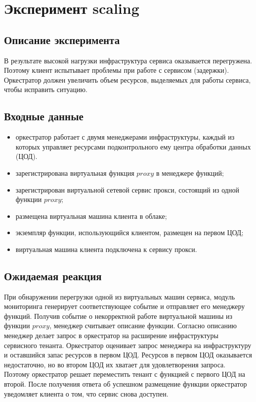 \documentclass[oneside,final,14pt,a4paper]{extreport}
\begin{document}
\section{Эксперимент scaling}
\subsection{Описание эксперимента}
В результате высокой нагрузки инфраструктура сервиса оказывается перегружена. Поэтому клиент испытывает проблемы при работе с сервисом (задержки). Оркестратор должен увеличить объем ресурсов, выделяемых для работы сервиса, чтобы исправить ситуацию.

\subsection{Входные данные}
\begin{itemize}
	\item оркестратор работает с двумя менеджерами инфраструктуры, каждый из которых управляет ресурсами подконтрольного ему центра обработки данных (ЦОД).
	\item зарегистрирована виртуальная функция $proxy$ в менеджере функций;
	\item зарегистрирован виртуальной сетевой сервис прокси, состоящий из одной функции $proxy$;
	\item размещена виртуальная машина клиента в облаке;
	\item экземпляр функции, использующийся клиентом, размещен на первом ЦОД;
	\item виртуальная машина клиента подключена к сервису прокси.
\end{itemize}

\subsection{Ожидаемая реакция}
При обнаружении перегрузки одной из виртуальных машин сервиса, модуль мониторинга генерирует соответствующее событие и отправляет его менеджеру функций. Получив событие о некорректной работе виртуальной машины из функции $proxy$, менеджер считывает описание функции. Согласно описанию менеджер делает запрос в оркестратор на расширение инфраструктуры сервисного тенанта. Оркестратор оценивает запрос менеджера на инфраструктуру и оставшийся запас ресурсов в первом ЦОД. Ресурсов в первом ЦОД оказывается недостаточно, но во втором ЦОД их хватает для удовлетворения запроса. Поэтому оркестратор решает переместить тенант с функцией с первого ЦОД на второй. После получения ответа об успешном размещение функции оркестратор уведомляет клиента о том, что сервис снова доступен.
\end{document}
